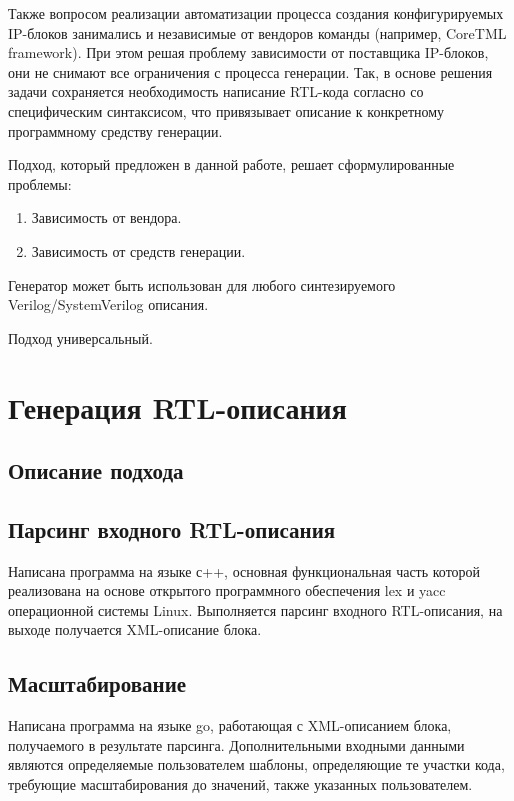 Также вопросом реализации автоматизации процесса создания конфигурируемых IP-блоков занимались и независимые от вендоров команды (например, CoreTML framework). При этом решая проблему зависимости от поставщика IP-блоков, они не снимают все ограничения с процесса генерации. Так, в основе решения задачи сохраняется необходимость написание RTL-кода согласно со специфическим синтаксисом, что привязывает описание к конкретному программному средству генерации.

Подход, который предложен в данной работе, решает сформулированные проблемы:

\begin{enumerate}
  \item Зависимость от вендора.
  \item Зависимость от средств генерации.
\end{enumerate}

Генератор может быть использован для любого синтезируемого Verilog/SystemVerilog описания.

Подход универсальный.

\section{Генерация RTL-описания}

\subsection{Описание подхода}

\subsection{Парсинг входного RTL-описания}

Написана программа на языке с++, основная функциональная часть которой реализована на основе открытого программного обеспечения lex и yacc операционной системы Linux. Выполняется парсинг входного RTL-описания, на выходе получается XML-описание блока.

\subsection{Масштабирование}

Написана программа на языке go, работающая с XML-описанием блока, получаемого в результате парсинга. Дополнительными входными данными являются определяемые пользователем шаблоны, определяющие те участки кода, требующие масштабирования до значений, также указанных пользователем.

